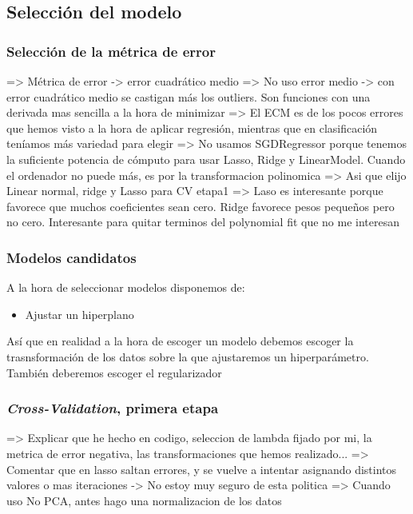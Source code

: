 \documentclass[11pt]{article}
\begin{document}
\subsection{Selección del modelo}

\subsubsection{Selección de la métrica de error}

=> Métrica de error -> error cuadrático medio
=> No uso error medio -> con error cuadrático medio se castigan más los outliers. Son funciones con una derivada mas sencilla a la hora de minimizar
=> El ECM es de los pocos errores que hemos visto a la hora de aplicar regresión, mientras que en clasificación teníamos más variedad para elegir
=> No usamos SGDRegressor porque tenemos la suficiente potencia de cómputo para usar Lasso, Ridge y LinearModel. Cuando el ordenador no puede más, es por la transformacion polinomica
=> Asi que elijo Linear normal, ridge y Lasso para CV etapa1
    => Laso es interesante porque favorece que muchos coeficientes sean cero. Ridge favorece pesos pequeños pero no cero. Interesante para quitar terminos del polynomial fit que no me interesan

\subsubsection{Modelos candidatos}

A la hora de seleccionar modelos disponemos de:

\begin{itemize}
    \item Ajustar un hiperplano
\end{itemize}

Así que en realidad a la hora de escoger un modelo debemos escoger la trasnsformación de los datos sobre la que ajustaremos un hiperparámetro. También deberemos escoger el regularizador

\subsubsection{\emph{Cross-Validation}, primera etapa}

=> Explicar que he hecho en codigo, seleccion de lambda fijado por mi, la metrica de error negativa, las transformaciones que hemos realizado...
=> Comentar que en lasso saltan errores, y se vuelve a intentar asignando distintos valores o mas iteraciones -> No estoy muy seguro de esta politica
=> Cuando uso No PCA, antes hago una normalizacion de los datos
\end{document}
